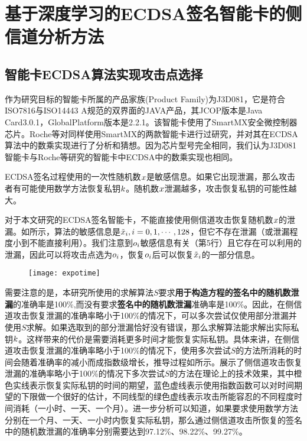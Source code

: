 \chapter{基于深度学习的ECDSA签名智能卡的侧信道分析方法}\label{chap:search2}{
	\section{智能卡ECDSA算法实现攻击点选择}
	
	作为研究目标的智能卡所属的产品家族(Product Family)为J3D081，它是符合ISO7816\citep{ISO/IEC7816}与ISO14443 A\citep{ISO/IEC14443}规范的双界面的JAVA产品，其JCOP版本是Java Card3.0.1，GlobalPlatform版本是2.2.1。该智能卡使用了SmartMX\citep{p5x}安全微控制器芯片。Roche等\citep{Roche21}对同样使用SmartMX的两款智能卡进行过研究，并对其在ECDSA算法中的数乘实现进行了分析和猜想。因为芯片型号完全相同，我们认为J3D081智能卡与Roche等\citep{Roche21}研究的智能卡中ECDSA中的数乘实现也相同。
	
	ECDSA签名过程使用的一次性随机数$x$是敏感信息。如果它出现泄漏，那么攻击者有可能使用数学方法恢复私钥$k$。随机数$x$泄漏越多，攻击恢复私钥的可能性越大。
	
	对于本文研究的ECDSA签名智能卡，不能直接使用侧信道攻击恢复随机数$x$的泄漏。如所示，算法的敏感信息是$\tilde{x}_i,i=0,1,\cdots, 128$，但它不存在泄漏（或泄漏程度小到不能直接利用）。我们注意到$o_i$敏感信息有关（第5行）且它存在可以利用的泄漏，因此可以将攻击点选为$o_i$，恢复$o_i$后可以恢复$\tilde {x}_i$的一部分信息。
	
	\begin{figure}[!h]
		\begin{center}
			\texttt{[image: expotime]}
			\label{fig:expotime}
		\end{center}
	\end{figure}
	
	需要注意的是，本研究所使用的求解算法$S$要求\textbf{用于构造方程的签名中的随机数泄漏}的准确率是100\%,而没有要求\textbf{签名中的随机数泄漏}准确率是100\%。因此，在侧信道攻击恢复泄漏的准确率略小于100\%的情况下，可以多次尝试仅使用部分泄漏并使用$S$求解。如果选取到的部分泄漏恰好没有错误，那么求解算法能求解出实际私钥$k$。这样带来的代价是需要消耗更多时间才能恢复实际私钥。具体来讲，在侧信道攻击恢复泄漏的准确率略小于100\%的情况下，使用多次尝试$S$的方法所消耗的时间会随着准确率的减小而成指数级增长，推导过程如所示。展示了侧信道攻击恢复泄漏的准确率略小于100\%的情况下多次尝试$S$的方法在理论上的技术效果，其中橙色实线表示恢复实际私钥的时间的期望，蓝色虚线表示使用指数函数可以对时间期望的下限做一个很好的估计，不同线型的绿色虚线表示攻击所能容忍的不同程度时间消耗（一小时、一天、一个月）。进一步分析可以知道，如果要求使用数学方法分别在一个月、一天、一小时内恢复实际私钥，那么通过侧信道攻击所恢复的签名中的随机数泄漏的准确率分别需要达到97.12\%、98.22\%、99.27\%。

}
